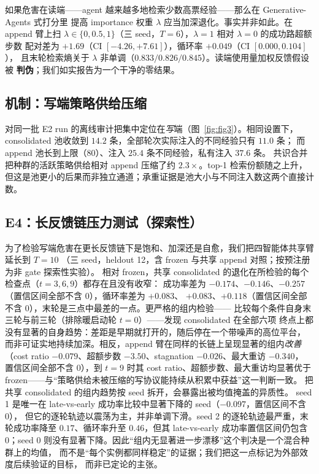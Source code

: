 \documentclass[UTF8,11pt]{ctexart}
\begin{document}
如果危害在读端——agent 越来越多地检索少数高票经验——那么在 Generative-Agents 式打分里
提高 importance 权重 $\lambda$ 应当加深退化。事实并非如此。在 append 臂上扫
$\lambda\in\{0,0.5,1\}$（三 seed，$T=6$），$\lambda{=}1$ 相对 $\lambda{=}0$ 的成功路超额步数
配对差为 $+1.69$（CI $[-4.26, +7.61]$），循环率 $+0.049$（CI $[0.000, 0.104]$），
且末轮检索熵关于 $\lambda$ 非单调（$0.833/0.826/0.845$）。读端使用量加权反馈假设被
\textbf{判伪}；我们如实报告为一个干净的零结果。

\subsection{机制：写端策略供给压缩}

对同一批 E2 run 的离线审计把集中定位在\emph{写}端（图~\ref{fig:fig3}）。相同设置下，
consolidated 池收敛到 $14.2$ 条，全部轮次实际注入的不同经验只有 $11.0$ 条；
而 append 池长到上限（$80$）、注入 $25.4$ 条不同经验，私有注入 $37.6$ 条。
共识合并把种群的活跃策略供给相对 append 压缩了约 $2.3\times$。top-1 检索份额随之上升，
但这是池更小的后果而非独立通道；承重证据是池大小与不同注入数这两个直接计数。

\subsection{E4：长反馈链压力测试（探索性）}

为了检验写端危害在更长反馈链下是饱和、加深还是自愈，我们把四智能体共享臂延长到 $T{=}10$
（三 seed，heldout 12，含 frozen 与共享 append 对照；按预注册为非 gate 探索性实验）。
相对 frozen，共享 consolidated 的退化在所检验的每个检查点（$t=3,6,9$）都存在且没有收窄：
成功率差为 $-0.174$、$-0.146$、$-0.257$（置信区间全部不含 0），循环率差为 $+0.083$、
$+0.083$、$+0.118$（置信区间全部不含 0），末轮是三点中最差的一点。更严格的组内检验——
比较每个条件自身末三轮与前三轮（排除暖启动轮 $t{=}0$）——发现 consolidated 在全部六项
终点上都没有显著的自身趋势：差距是早期就打开的，随后停在一个带噪声的高位平台，
而非可证实地持续加深。相反，append 臂在同样的长链上呈现显著的组内\emph{改善}
（cost ratio $-0.079$、超额步数 $-3.50$、stagnation $-0.026$、最大重访 $-0.340$，
置信区间全部不含 0），到 $t{=}9$ 时其 cost ratio、超额步数、最大重访均显著优于
frozen——与“策略供给未被压缩的写协议能持续从积累中获益”这一判断一致。
把共享 consolidated 的组内趋势按 seed 拆开，会暴露出被均值掩盖的异质性。
seed 1 是唯一在 late-vs-early 成功率比较中显著下降的 seed（$-0.097$，置信区间不含 0），
但它的逐轮轨迹以震荡为主，并非单调下滑。seed 2 的逐轮轨迹最严重，末轮成功率降至
$0.17$、循环率升至 $0.46$，但其 late-vs-early 成功率置信区间仍包含 0；seed 0
则没有显著下降。因此“组内无显著进一步漂移”这个判决是一个混合种群上的均值，
而不是“每个实例都同样稳定”的证据；我们把这一点标记为外部效度后续验证的目标，
而非已定论的主张。
\end{document}

